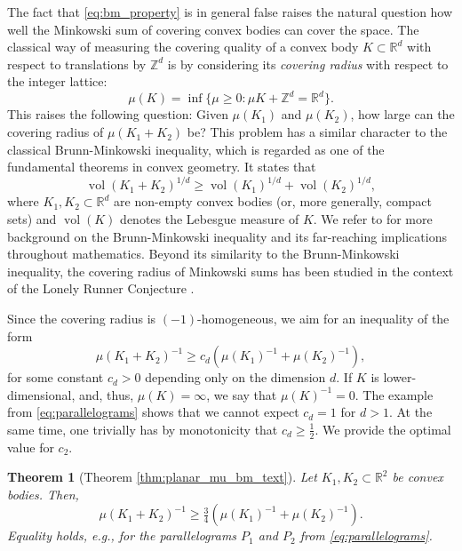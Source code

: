 \documentclass[11pt, a4paper]{amsart}
\newcommand{\RR}{\mathbb{R}}
\newcommand{\ZZ}{\mathbb{Z}}
\DeclareMathOperator{\vol}{vol}
\numberwithin{equation}{section}
\theoremstyle{plain}
\newtheorem{theorem}{Theorem}[section]
\begin{document}
The fact that \eqref{eq:bm_property} is in general false raises the natural question how well the Minkowski sum of covering convex bodies can cover the space. The classical way of measuring the covering quality of a convex body $K\subset\RR^d$ with respect to translations by $\ZZ^d$ is by considering its \emph{covering radius} with respect to the integer lattice:
\begin{equation}
\label{eq:covering_radius}
\mu(K) = \inf\{\mu\geq 0 : \mu K + \ZZ^d = \RR^d\}.
\end{equation}
This raises the following question: Given $\mu(K_1)$ and $\mu(K_2)$, how large can the covering radius of $\mu(K_1+K_2)$ be? This problem has a similar character to the classical Brunn-Minkowski inequality, which is regarded as one of the fundamental theorems in convex geometry. It states that
\begin{equation}
\label{eq:bm}
\vol(K_1 + K_2)^{1/d} \geq \vol(K_1)^{1/d} + \vol(K_2)^{1/d},
\end{equation}
where $K_1,K_2\subset\RR^d$ are non-empty convex bodies (or, more generally, compact sets) and $\vol(K)$ denotes the Lebesgue measure of $K$. We refer to \cite{gardner} for more background on the Brunn-Minkowski inequality and its far-reaching implications throughout mathematics. Beyond its similarity to the Brunn-Minkowski inequality, the covering radius of Minkowski sums has been studied in the context of the Lonely Runner Conjecture \cite{shifted_lr,blancocriadosantos,covrad_lonely_runner}.

Since the covering radius is $(-1)$-homogeneous, we aim for an inequality of the form
\begin{equation}
\label{eq:mu_bm_prototype}
\mu(K_1 + K_2)^{-1} \geq c_d(\mu(K_1)^{-1} +\mu(K_2)^{-1}),
\end{equation}
for some constant $c_d > 0$ depending only on the dimension $d$. If $K$ is lower-dimensional, and, thus, $\mu(K)=\infty$, we say that $\mu(K)^{-1} = 0$. The example from \eqref{eq:parallelograms} shows that we cannot expect $c_d=1$ for $d > 1$. At the same time, one trivially has by monotonicity that $c_d \geq \tfrac 12$. We provide the optimal value for $c_2$.

\begin{theorem}[Theorem \ref{thm:planar_mu_bm_text}]
\label{thm:planar_mu_bm}
Let $K_1,K_2\subset\RR^2$ be convex bodies. Then,
\[
\mu(K_1 + K_2)^{-1} \geq \tfrac 34 (\mu(K_1)^{-1} + \mu(K_2)^{-1}).
\]
Equality holds, e.g., for the parallelograms $P_1$ and $P_2$ from \eqref{eq:parallelograms}.
\end{theorem}
\end{document}
